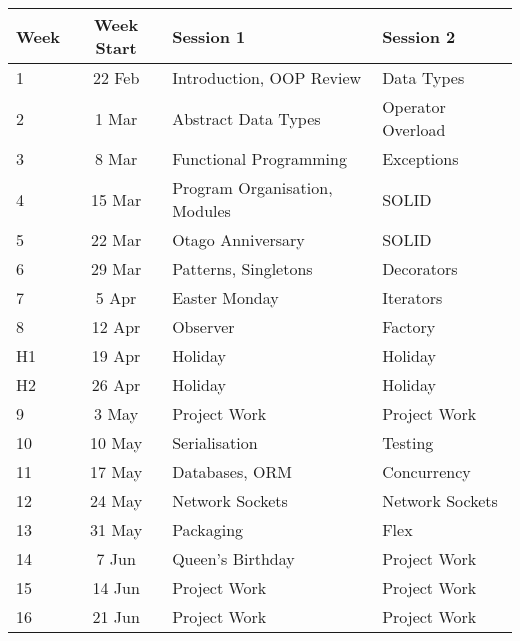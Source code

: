 \documentclass{article}
\begin{document}
\renewcommand{\arraystretch}{1.5}
\begin{tabular}{|l|c|l|l|}
\hline
 Week     & Week Start & Session 1                          & Session 2               \\ \hline
 1        & 22 Feb     & Introduction, OOP Review           & Data Types              \\ \hline
 2        &  1 Mar     & Abstract Data Types                & Operator Overload       \\ \hline
 3        &  8 Mar     & Functional Programming             & Exceptions              \\ \hline
 4        & 15 Mar     & Program Organisation, Modules      & SOLID                   \\ \hline
 5        & 22 Mar     & Otago Anniversary                  & SOLID                   \\ \hline
 6        & 29 Mar     & Patterns, Singletons               & Decorators              \\ \hline
 7        &  5 Apr     & Easter Monday                      & Iterators               \\ \hline
 8        & 12 Apr     & Observer                           & Factory                 \\ \hline
 H1       & 19 Apr     & Holiday                            & Holiday                 \\ \hline
 H2       & 26 Apr     & Holiday                            & Holiday                 \\ \hline
 9        &  3 May     & Project Work                       & Project Work            \\ \hline
 10       & 10 May     & Serialisation                      & Testing                 \\ \hline
 11       & 17 May     & Databases, ORM                     & Concurrency             \\ \hline
 12       & 24 May     & Network Sockets                    & Network Sockets         \\ \hline
 13       & 31 May     & Packaging                          & Flex                    \\ \hline
 14       &  7 Jun     & Queen's Birthday                   & Project Work            \\ \hline
 15       & 14 Jun     & Project Work                       & Project Work            \\ \hline
 16       & 21 Jun     & Project Work                       & Project Work            \\ \hline
\end{tabular}
\end{document}

